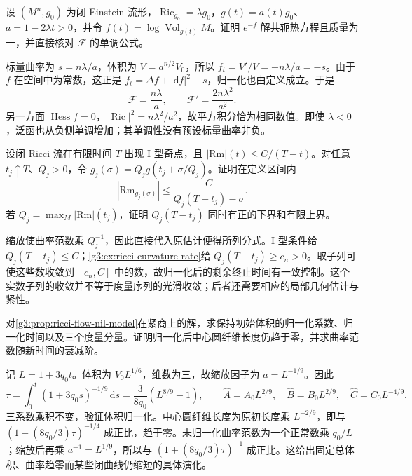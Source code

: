 \begin{exercise}\label{g3:ex:ricci-einstein-F}
设 \((M^n,g_0)\) 为闭 Einstein 流形，\(\operatorname{Ric}_{g_0}=\lambda g_0\)，\(g(t)=a(t)g_0\)、\(a=1-2\lambda t>0\)，并令 \(f(t)=\log\operatorname{Vol}_{g(t)}M\)。证明 \(e^{-f}\) 解共轭热方程且质量为一，并直接核对 \(\mathcal F\) 的单调公式。
\end{exercise}
\begin{solution}
标量曲率为 \(s=n\lambda/a\)，体积为 \(V=a^{n/2}V_0\)，所以 \(f_t=V'/V=-n\lambda/a=-s\)。由于 \(f\) 在空间中为常数，这正是 \(f_t=\Delta f+|\mathrm df|^2-s\)，归一化也由定义成立。于是
\[
\mathcal F=\frac{n\lambda}{a},\qquad
\mathcal F'=\frac{2n\lambda^2}{a^2}.
\]
另一方面 \(\operatorname{Hess}f=0\)，\(|\operatorname{Ric}|^2=n\lambda^2/a^2\)，故平方积分恰为相同数值。即使 \(\lambda<0\)，泛函也从负侧单调增加；其单调性没有预设标量曲率非负。
\end{solution}

\begin{exercise}\label{g3:ex:ricci-type-I-bound}
设闭 Ricci 流在有限时间 \(T\) 出现 I 型奇点，且 \(|\mathrm{Rm}|(t)\le C/(T-t)\)。对任意 \(t_j\uparrow T\)、\(Q_j>0\)，令 \(g_j(\sigma)=Q_jg(t_j+\sigma/Q_j)\)。证明在定义区间内
\[
|\mathrm{Rm}_{g_j(\sigma)}|\le
\frac{C}{Q_j(T-t_j)-\sigma}.
\]
若 \(Q_j=\max_M|\mathrm{Rm}|(t_j)\)，证明 \(Q_j(T-t_j)\) 同时有正的下界和有限上界。
\end{exercise}
\begin{solution}
缩放使曲率范数乘 \(Q_j^{-1}\)，因此直接代入原估计便得所列分式。I 型条件给 \(Q_j(T-t_j)\le C\)；\cref{g3:ex:ricci-curvature-rate}给 \(Q_j(T-t_j)\ge c_n>0\)。取子列可使这些数收敛到 \([c_n,C]\) 中的数，故归一化后的剩余终止时间有一致控制。这个实数子列的收敛并不等于度量序列的光滑收敛；后者还需要相应的局部几何估计与紧性。
\end{solution}

\begin{exercise}\label{g3:ex:ricci-normalized-nil}
对\cref{g3:prop:ricci-flow-nil-model}在紧商上的解，求保持初始体积的归一化系数、归一化时间以及三个度量分量。证明归一化后中心圆纤维长度仍趋于零，并求曲率范数随新时间的衰减阶。
\end{exercise}
\begin{solution}
记 \(L=1+3q_0t\)。体积为 \(V_0L^{1/6}\)，维数为三，故缩放因子为 \(a=L^{-1/9}\)。因此
\[
\tau=\int_0^t(1+3q_0s)^{-1/9}\,\mathrm ds
=\frac{3}{8q_0}(L^{8/9}-1),
\qquad
\widehat A=A_0L^{2/9},\quad
\widehat B=B_0L^{2/9},\quad
\widehat C=C_0L^{-4/9}.
\]
三系数乘积不变，验证体积归一化。中心圆纤维长度为原初长度乘 \(L^{-2/9}\)，即与 \((1+(8q_0/3)\tau)^{-1/4}\) 成正比，趋于零。未归一化曲率范数为一个正常数乘 \(q_0/L\)；缩放后再乘 \(a^{-1}=L^{1/9}\)，所以与 \((1+(8q_0/3)\tau)^{-1}\) 成正比。这给出固定总体积、曲率趋零而某些闭曲线仍缩短的具体演化。
\end{solution}

